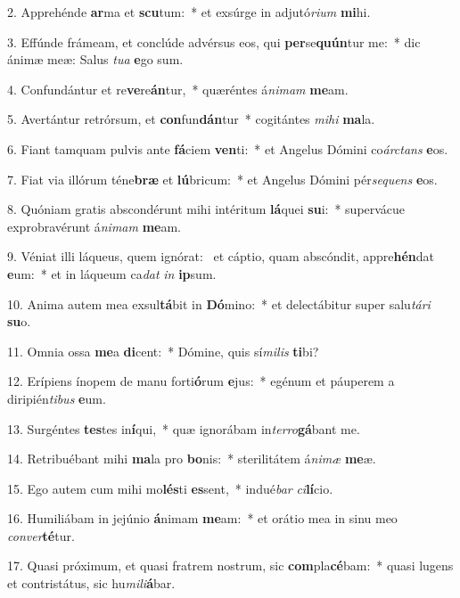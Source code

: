 2. Apprehénde \textbf{ar}ma et \textbf{scu}tum:~*  et exsúrge in adjutó\textit{ri}\textit{um} \textbf{mi}hi.\

3. Effúnde frámeam, et conclúde advérsus eos, qui \textbf{per}se\textbf{quún}tur me:~*  dic ánimæ meæ: Salus \textit{tu}\textit{a} \textbf{e}go sum.\

4. Confundántur et re\textbf{ve}re\textbf{án}tur,~*  quæréntes á\textit{ni}\textit{mam} \textbf{me}am.\

5. Avertántur retrórsum, et \textbf{con}fun\textbf{dán}tur~*  cogitántes \textit{mi}\textit{hi} \textbf{ma}la.\

6. Fiant tamquam pulvis ante \textbf{fá}ciem \textbf{ven}ti:~*  et Angelus Dómini co\textit{árc}\textit{tans} \textbf{e}os.\

7. Fiat via illórum téne\textbf{bræ} et \textbf{lú}bricum:~*  et Angelus Dómini pér\textit{se}\textit{quens} \textbf{e}os.\

8. Quóniam gratis abscondérunt mihi intéritum \textbf{lá}quei \textbf{su}i:~*  supervácue exprobravérunt á\textit{ni}\textit{mam} \textbf{me}am.\

9. Véniat illi láqueus, quem ignórat: \dag\  et cáptio, quam abscóndit, appre\textbf{hén}dat \textbf{e}um:~*  et in láqueum ca\textit{dat} \textit{in} \textbf{ip}sum.\

10. Anima autem mea exsul\textbf{tá}bit in \textbf{Dó}mino:~*  et delectábitur super salu\textit{tá}\textit{ri} \textbf{su}o.\

11. Omnia ossa \textbf{me}a \textbf{di}cent:~*  Dómine, quis sí\textit{mi}\textit{lis} \textbf{ti}bi?\

12. Erípiens ínopem de manu forti\textbf{ó}rum \textbf{e}jus:~*  egénum et páuperem a diripién\textit{ti}\textit{bus} \textbf{e}um.\

13. Surgéntes \textbf{tes}tes in\textbf{í}qui,~*  quæ ignorábam in\textit{ter}\textit{ro}\textbf{gá}bant me.\

14. Retribuébant mihi \textbf{ma}la pro \textbf{bo}nis:~*  sterilitátem á\textit{ni}\textit{mæ} \textbf{me}æ.\

15. Ego autem cum mihi mo\textbf{lés}ti \textbf{es}sent,~*  indué\textit{bar} \textit{ci}\textbf{lí}cio.\

16. Humiliábam in jejúnio \textbf{á}nimam \textbf{me}am:~*  et orátio mea in sinu meo \textit{con}\textit{ver}\textbf{té}tur.\

17. Quasi próximum, et quasi fratrem nostrum, sic \textbf{com}pla\textbf{cé}bam:~*  quasi lugens et contristátus, sic hu\textit{mi}\textit{li}\textbf{á}bar.\

